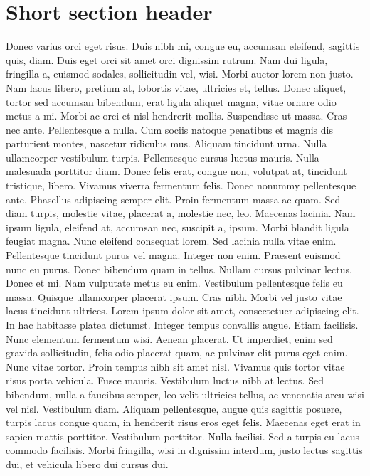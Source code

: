\documentclass[draft,12pt,twoside,a4paper]{book}
\begin{document}
\section{Short section header}
Donec varius orci eget risus.
Duis nibh mi, congue eu, accumsan eleifend, sagittis quis, diam.
Duis eget orci sit amet orci dignissim rutrum.
Nam dui ligula, fringilla a, euismod sodales, sollicitudin vel, wisi.
Morbi auctor lorem non justo.
Nam lacus libero, pretium at, lobortis vitae, ultricies et, tellus.
Donec aliquet, tortor sed accumsan bibendum, erat ligula aliquet magna,
 vitae ornare odio metus a mi.
Morbi ac orci et nisl hendrerit mollis.
Suspendisse ut massa.
Cras nec ante.
Pellentesque a nulla.
Cum sociis natoque penatibus et magnis dis parturient montes,
 nascetur ridiculus mus.
Aliquam tincidunt urna.
Nulla ullamcorper vestibulum turpis.
Pellentesque cursus luctus mauris.
Nulla malesuada porttitor diam.
Donec felis erat, congue non, volutpat at, tincidunt tristique, libero.
Vivamus viverra fermentum felis.
Donec nonummy pellentesque ante.
Phasellus adipiscing semper elit.
Proin fermentum massa ac quam.
Sed diam turpis, molestie vitae, placerat a, molestie nec, leo.
Maecenas lacinia.
Nam ipsum ligula, eleifend at, accumsan nec, suscipit a, ipsum.
Morbi blandit ligula feugiat magna.
Nunc eleifend consequat lorem.
Sed lacinia nulla vitae enim.
Pellentesque tincidunt purus vel magna.
Integer non enim.
Praesent euismod nunc eu purus.
Donec bibendum quam in tellus.
Nullam cursus pulvinar lectus.
Donec et mi.
Nam vulputate metus eu enim.
Vestibulum pellentesque felis eu massa.
Quisque ullamcorper placerat ipsum.
Cras nibh.
Morbi vel justo vitae lacus tincidunt ultrices.
Lorem ipsum dolor sit amet, consectetuer adipiscing elit.
In hac habitasse platea dictumst.
Integer tempus convallis augue.
Etiam facilisis.
Nunc elementum fermentum wisi.
Aenean placerat.
Ut imperdiet, enim sed gravida sollicitudin, felis odio placerat quam,
 ac pulvinar elit purus eget enim.
Nunc vitae tortor.
Proin tempus nibh sit amet nisl.
Vivamus quis tortor vitae risus porta vehicula.
Fusce mauris.
Vestibulum luctus nibh at lectus.
Sed bibendum, nulla a faucibus semper, leo velit ultricies tellus,
 ac venenatis arcu wisi vel nisl.
Vestibulum diam.
Aliquam pellentesque, augue quis sagittis posuere, turpis lacus congue quam,
 in hendrerit risus eros eget felis.
Maecenas eget erat in sapien mattis porttitor.
Vestibulum porttitor.
Nulla facilisi.
Sed a turpis eu lacus commodo facilisis.
Morbi fringilla, wisi in dignissim interdum, justo lectus sagittis dui,
 et vehicula libero dui cursus dui.
\end{document}
